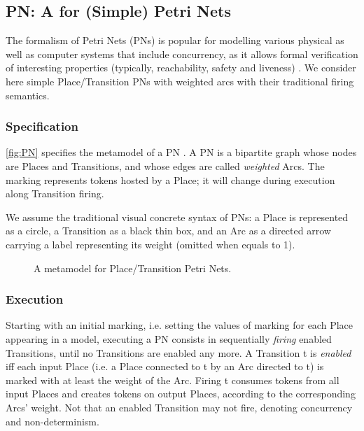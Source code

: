 \subsection{\textsf{PN}: A \DSL for (Simple) Petri Nets}
\label{sec:Examples:PN}

The formalism of Petri Nets (PNs) is popular for modelling various physical as well as
computer systems that include concurrency, as it allows formal verification of 
interesting properties (typically, reachability, safety and liveness)
\cite{B:He-Murata:2005}. We consider here simple Place/Transition PNs with weighted
arcs with their traditional firing semantics. 

\subsubsection{Specification}
\label{sec:Examples:PN:Specification}

\autoref{fig:PN} specifies the metamodel of a PN \DSL. A \textsf{PN} is a bipartite
graph whose nodes are \textsf{Place}s and \textsf{Transition}s, and whose edges are
called \emph{weighted} \textsf{Arc}s. The \textsf{marking} represents tokens hosted
by a \textsf{Place}; it will change during execution along \textsf{Transition} firing.
 
We assume the traditional visual concrete syntax of PNs: a \textsf{Place} is 
represented as a circle, a \textsf{Transition} as a black thin box, and an 
\textsf{Arc} as a directed arrow carrying a label representing its \textsf{weight}
(omitted when equals to 1).

\begin{figure}%
   \caption{A metamodel for Place/Transition Petri Nets.}%
   \label{fig:FSM_MM}%
\end{figure}



\subsubsection{Execution}
\label{sec:Examples:PN:Execution}

Starting with an initial marking, i.e. setting the values of \textsf{marking} for
each \textsf{Place} appearing in a model, executing a \textsf{PN} consists in 
sequentially \emph{firing} enabled \textsf{Transition}s, until no 
\textsf{Transition}s are enabled any more. A \textsf{Transition} \textsf{t} is 
\emph{enabled} iff each input \textsf{Place} (i.e. a \textsf{Place} connected to
\textsf{t} by an \textsf{Arc} directed to \textsf{t}) is marked with at least the
weight of the \textsf{Arc}. Firing \textsf{t} consumes tokens from all input 
\textsf{Place}s and creates tokens on output \textsf{Place}s, according to the
corresponding \textsf{Arc}s' \textsf{weight}. Not that an enabled \textsf{Transition}
may not fire, denoting concurrency and non-determinism.

